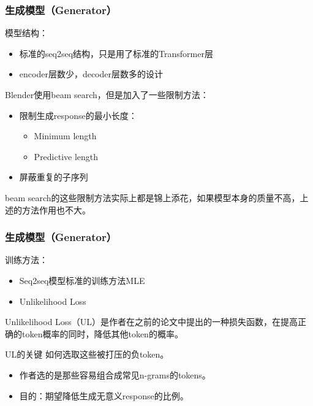 \documentclass{beamer}
\begin{document}
\begin{frame}
    \frametitle{生成模型（Generator）}

    模型结构：

    \begin{itemize}
        \item 标准的seq2seq结构，只是用了标准的Transformer层
        \item encoder层数少，decoder层数多的设计
    \end{itemize}

    Blender使用beam search，但是加入了一些限制方法：

    \begin{itemize}
        \item 限制生成response的最小长度：
            \begin{itemize}
                \item Minimum length
                \item Predictive length
            \end{itemize}
        \item 屏蔽重复的子序列
    \end{itemize}

    beam search的这些限制方法实际上都是锦上添花，如果模型本身的质量不高，上述的方法作用也不大。
\end{frame}

\begin{frame}
    \frametitle{生成模型（Generator）}

    训练方法：

    \begin{itemize}
        \item Seq2seq模型标准的训练方法MLE
        \item Unlikelihood Loss
    \end{itemize}

    Unlikelihood Loss（UL）是作者在之前的论文中提出的一种损失函数，在提高正确的token概率的同时，降低其他token的概率。

    \begin{block}{UL的关键}
        如何选取这些被打压的负token。

        \begin{itemize}
            \item 作者选的是那些容易组合成常见n-grams的tokens。
            \item 目的：期望降低生成无意义response的比例。
        \end{itemize}
    \end{block}

\end{frame}
\end{document}
